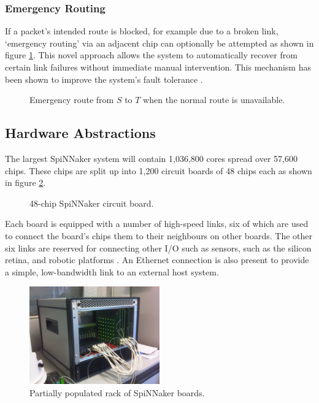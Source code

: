 			\subsubsection{Emergency Routing}
				
				If a packet's intended route is blocked, for example due to a broken
				link, `emergency routing' via an adjacent chip can optionally be
				attempted as shown in figure \ref{fig:emergency-routing}. This novel
				approach allows the system to automatically recover from certain link
				failures without immediate manual intervention. This mechanism has been
				shown to improve the system's fault tolerance \cite{navaridas09}.
				
				\begin{figure}
					\center
					
					\caption[Emergency routing example.]{Emergency route from $S$ to $T$
					when the normal route is unavailable.}
					\label{fig:emergency-routing}
				\end{figure}
			
		
		\subsection{Hardware Abstractions}
			
			
			The largest SpiNNaker system will contain 1,036,800 cores spread over
			57,600 chips.  These chips are split up into 1,200 circuit boards of 48
			chips each as shown in figure \ref{fig:spinn4labelled}.
			
			\begin{figure}
				\center
				
				\caption{48-chip SpiNNaker circuit board.}
				\label{fig:spinn4labelled}
			\end{figure}
			
			Each board is equipped with a number of high-speed links, six of which are
			used to connect the board's chips them to their neighbours on other
			boards. The other six links are reserved for connecting other I/O such as
			sensors, such as the silicon retina, and robotic platforms
			\cite{davies10}. An Ethernet connection is also present to provide a
			simple, low-bandwidth link to an external host system.
			
			\begin{figure}
				\center
				\includegraphics[width=0.5\textwidth]{figures/spiNNaker103.jpg}
				\caption{Partially populated rack of SpiNNaker boards.}
				\label{fig:spiNNaker103}
			\end{figure}
			
